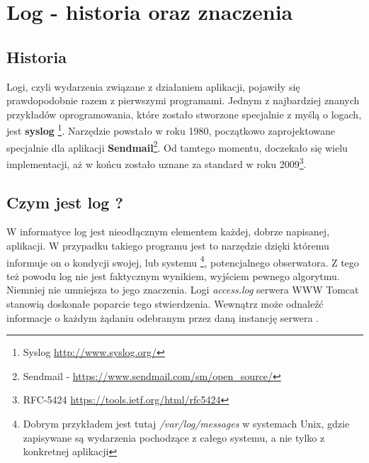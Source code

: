 \section{Log - historia oraz znaczenia}
\label{chapter:logs:history}

    \subsection{Historia}
    Logi, czyli wydarzenia związane z działaniem aplikacji, pojawiły się prawdopodobnie razem z pierwszymi programami.
    Jednym z najbardziej znanych przykładów oprogramowania, które zostało stworzone specjalnie z myślą o logach, jest \textbf{syslog}
    \footnote{Syslog \url{http://www.syslog.org/}}. Narzędzie powstało w roku 1980, początkowo zaprojektowane specjalnie
    dla aplikacji \textbf{Sendmail}\footnote{Sendmail - \url{https://www.sendmail.com/sm/open_source/}}. Od tamtego momentu,
    doczekało się wielu implementacji, aż w końcu zostało uznane za standard w roku 2009\footnote{RFC-5424 \url{https://tools.ietf.org/html/rfc5424}}.

	\subsection{Czym jest log ?}
    \label{chapter:logs:history:what_is_log}
	W informatyce log jest nieodłącznym elementem każdej, dobrze napisanej, aplikacji. 
    W przypadku takiego programu jest to narzędzie dzięki któremu informuje on
    o kondycji swojej, lub systemu \footnote{Dobrym przykładem jest tutaj \textit{/var/log/messages} w systemach Unix, 
    gdzie zapisywane są wydarzenia pochodzące z całego systemu, a nie tylko z konkretnej aplikacji}, potencjalnego obserwatora.
    Z tego też powodu log nie jest faktycznym wynikiem, wyjściem pewnego algorytmu. Niemniej nie umniejsza to jego znaczenia.
    Logi \textit{access.log} serwera WWW Tomcat stanowią doskonałe poparcie tego stwierdzenia. 
    Wewnątrz może odnaleźć informacje o każdym żądaniu odebranym przez daną instancję serwera \cite{tomcat_logs}.
    

